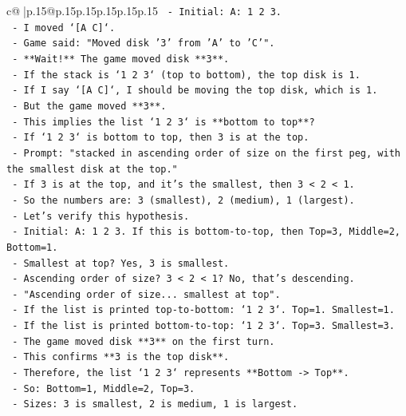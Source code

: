 \documentclass{article}
\begin{document}
{\begin{supertabular}{c@{$\;$}|p{.15\linewidth}@{}p{.15\linewidth}p{.15\linewidth}p{.15\linewidth}p{.15\linewidth}p{.15\linewidth}}
{{{\texttt{  {-} Initial: A: 1 2 3.} \\
\texttt{  {-} I moved `{[}A C{]}`.} \\
\texttt{  {-} Game said: "Moved disk '3' from 'A' to 'C'".} \\
\texttt{  {-} **Wait!** The game moved disk **3**.} \\
\texttt{  {-} If the stack is `1 2 3` (top to bottom), the top disk is 1.} \\
\texttt{  {-} If I say `{[}A C{]}`, I should be moving the top disk, which is 1.} \\
\texttt{  {-} But the game moved **3**.} \\
\texttt{  {-} This implies the list `1 2 3` is **bottom to top**?} \\
\texttt{  {-} If `1 2 3` is bottom to top, then 3 is at the top.} \\
\texttt{  {-} Prompt: "stacked in ascending order of size on the first peg, with the smallest disk at the top."} \\
\texttt{  {-} If 3 is at the top, and it's the smallest, then 3 < 2 < 1.} \\
\texttt{  {-} So the numbers are: 3 (smallest), 2 (medium), 1 (largest).} \\
\texttt{  {-} Let's verify this hypothesis.} \\
\texttt{  {-} Initial: A: 1 2 3. If this is bottom{-}to{-}top, then Top=3, Middle=2, Bottom=1.} \\
\texttt{  {-} Smallest at top? Yes, 3 is smallest.} \\
\texttt{  {-} Ascending order of size? 3 < 2 < 1? No, that's descending.} \\
\texttt{  {-} "Ascending order of size... smallest at top".} \\
\texttt{  {-} If the list is printed top{-}to{-}bottom: `1 2 3`. Top=1. Smallest=1.} \\
\texttt{  {-} If the list is printed bottom{-}to{-}top: `1 2 3`. Top=3. Smallest=3.} \\
\texttt{  {-} The game moved disk **3** on the first turn.} \\
\texttt{  {-} This confirms **3 is the top disk**.} \\
\texttt{  {-} Therefore, the list `1 2 3` represents **Bottom {-}> Top**.} \\
\texttt{  {-} So: Bottom=1, Middle=2, Top=3.} \\
\texttt{  {-} Sizes: 3 is smallest, 2 is medium, 1 is largest.} \\
}}}
\end{supertabular}}
\end{document}
